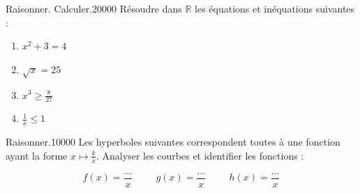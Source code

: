 \begin{pageParcoursd}
\begin{ExoCdN}{Raisonner. Calculer.}{2}{0}{0}{0}{0}
Résoudre dans $\mathbb{R}$ les équations et inéquations suivantes :

\begin{enumerate}
\item $x^2+3=4$
\item $\sqrt{x}=25$
\item $x^3\geq \frac{8}{27}$
\item $\frac{1}{x}\leq1$
\end{enumerate}

\end{ExoCdN}

\begin{ExoCdN}{Raisonner.}{1}{0}{0}{0}{0}
Les hyperboles suivantes correspondent toutes à une fonction ayant la forme $x\mapsto \frac{k}{x}$. Analyser les courbes et identifier les fonctions :

\[f(x)=\frac{\ldots}{x}\hspace{1cm}g(x)=\frac{\ldots}{x}\hspace{1cm}h(x)=\frac{\ldots}{x}\]


\end{ExoCdN}
\end{pageParcoursd}
